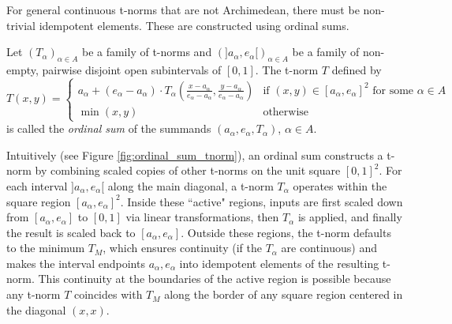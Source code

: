 For general continuous t-norms that are not Archimedean, there must be non-trivial idempotent elements. These are constructed using ordinal sums.
\begin{definition}
Let $(T_\alpha)_{\alpha \in A}$ be a family of t-norms and $(]a_\alpha, e_\alpha[)_{\alpha \in A}$ be a family of non-empty, pairwise disjoint open subintervals of $[0,1]$. The t-norm $T$ defined by
\[
T(x,y) =
\begin{cases}
  a_\alpha + (e_\alpha - a_\alpha) \cdot T_\alpha \left( \frac{x-a_\alpha}{e_\alpha - a_\alpha}, \frac{y-a_\alpha}{e_\alpha - a_\alpha} \right) & \text{if } (x,y) \in [a_\alpha, e_\alpha]^2 \text{ for some } \alpha \in A \\
  \min(x,y) & \text{otherwise}
\end{cases}
\]
is called the \emph{ordinal sum} of the summands $(a_\alpha, e_\alpha, T_\alpha)$, $\alpha \in A$.
\end{definition}
Intuitively (see Figure \ref{fig:ordinal_sum_tnorm}), an ordinal sum constructs a t-norm by combining scaled copies of other t-norms on the unit square $[0,1]^2$. For each interval $]a_\alpha, e_\alpha[$ along the main diagonal, a t-norm $T_\alpha$ operates within the square region $[a_\alpha, e_\alpha]^2$. Inside these ``active" regions, inputs are first scaled down from $[a_\alpha, e_\alpha]$ to $[0,1]$ via linear transformations, then $T_\alpha$ is applied, and finally the result is scaled back to $[a_\alpha, e_\alpha]$. Outside these regions, the t-norm defaults to the minimum $T_M$, which ensures continuity (if the $T_\alpha$ are continuous) and makes the interval endpoints $a_\alpha, e_\alpha$ into idempotent elements of the resulting t-norm. This continuity at the boundaries of the active region is possible because any t-norm $T$ coincides with $T_M$ along the border of any square region centered in the diagonal $(x,x)$.\\

